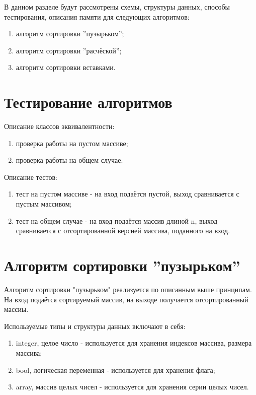 В данном разделе будут рассмотрены схемы, структуры данных, способы тестирования, описания памяти для следующих алгоритмов:
\begin{enumerate}
	\item алгоритм сортировки ''пузырьком'';
	\item алгоритм сортировки ''расчёской'';
	\item алгоритм сортировки вставками.
\end{enumerate}

\section{Тестирование алгоритмов}

Описание классов эквивалентности:
\begin{enumerate}
	\item проверка работы на пустом массиве;
	\item проверка работы на общем случае.
\end{enumerate}

Описание тестов:
\begin{enumerate}
	\item тест на пустом массиве - на вход подаётся пустой, выход сравнивается с пустым массивом;
	\item тест на общем случае - на вход подаётся массив длиной n, выход сравнивается с отсортированной версией массива, поданного на вход.
\end{enumerate}

\section{Алгоритм сортировки ''пузырьком''}

Алгоритм сортировки "пузырьком" реализуется по описанным выше принципам. На вход подаётся сортируемый массив, на выходе получается отсортированный массиы.

Используемые типы и структуры данных включают в себя:
\begin{enumerate}
	\item integer, целое число - используется для хранения индексов массива, размера массива;
	\item bool, логическая переменная - используется для хранения флага;
	\item array, массив целых чисел - используется для хранения серии целых чисел.
\end{enumerate}

